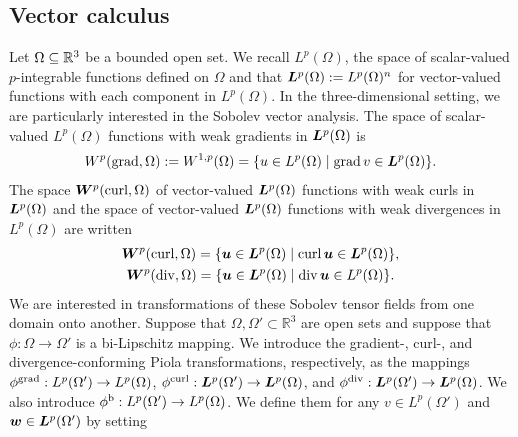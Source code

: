 \documentclass[10pt,a4paper]{article}
\newcommand\cye[1]{%
\protect\leavevmode
\begingroup
    \color{blue}%
    #1%
\endgroup
}
\begin{document}
\subsection{Vector calculus}

Let $\Omega \subseteq {\mathbb R}^{3}$ be a bounded open set. 
We recall $L^{p}(\Omega)$, the space of scalar-valued $p$-integrable functions defined on $\Omega$
and that $\bm{L}^{p}(\Omega) := L^{p}(\Omega)^{n}$ for vector-valued functions with each component in $L^{p}(\Omega)$. 
In the three-dimensional setting, we are particularly interested in the Sobolev vector analysis. 
The space of scalar-valued $L^{p}(\Omega)$ functions with weak gradients in $\bm{L}^{p}(\Omega)$ is 
\begin{gather*}
    W^{p}(\grad,\Omega) := W^{1,p}(\Omega) = \{ u \in L^{p}(\Omega) \suchthat \grad v \in \bfL^{p}(\Omega) \}
    .
\end{gather*}
The space $\bm{W}^{p}(\operatorname{curl},\Omega)$ of vector-valued $\bm{L}^{p}(\Omega)$ functions with weak curls in $\bm{L}^{p}(\Omega)$
and the space of vector-valued $\bm{L}^{p}(\Omega)$ functions with weak divergences in $L^{p}(\Omega)$ are written 
\begin{gather*}
    \bfW^{p}(\curl,\Omega) = \{ \bfu \in \bfL^{p}(\Omega) \suchthat \curl \bfu \in \bfL^{p}(\Omega) \},
    \\ 
    \bfW^{p}(\divergence,\Omega) = \{ \bfu \in \bfL^{p}(\Omega) \suchthat \divergence \bfu \in L^{p}(\Omega) \}.
\end{gather*}
We are interested in transformations of these Sobolev tensor fields from one domain onto another. 
Suppose that $\Omega, \Omega' \subset \mathbb{R}^3$ are open sets and suppose that $\phi: \Omega \to \Omega'$ is a bi-Lipschitz mapping.
We introduce the gradient-, curl-, and divergence-conforming Piola transformations, respectively, as the mappings 
$\phi^{\operatorname{grad}}: L^{p}(\Omega') \to L^{p}(\Omega)$,
$\phi^{\operatorname{curl}}: \bm{L}^{p}(\Omega') \to \bm{L}^{p}(\Omega)$, and 
$\phi^{\operatorname{div}}: \bm{L}^{p}(\Omega') \to \bm{L}^{p}(\Omega)$.
We also introduce 
$\phi^{\rm b}: L^{p}(\Omega') \to L^{p}(\Omega)$. 
We define them 
for any $v \in L^{p}(\Omega')$ and $\bm{w} \in \bm{L}^{p}(\Omega')$ by setting 
\end{document}
